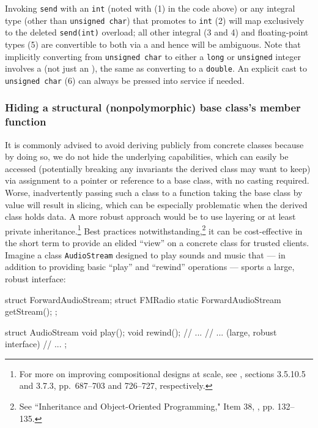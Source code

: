 \noindent Invoking \lstinline!send! with an \lstinline!int! (noted with (1) in the code above) or any integral type
(other than \lstinline!unsigned!~\lstinline!char!) that promotes to \lstinline!int! (2)
will map exclusively to the deleted \lstinline!send(int)! overload; all
other integral (3 and 4) and floating-point types (5) are convertible to
both via a  and hence will be ambiguous. Note that
implicitly converting from \lstinline!unsigned!~\lstinline!char! to either a
\lstinline!long! or \lstinline!unsigned! integer involves a  (not just an ), the same as
  converting to a \lstinline!double!.
An explicit cast to \lstinline!unsigned!~\lstinline!char! (6) can always be
pressed into service if needed.

\subsubsection[Hiding a structural (nonpolymorphic) base class's member function]{Hiding a structural (nonpolymorphic) base class’s member function}\label{hiding-a-structural-(nonpolymorphic)-base-class's-member-function}

It is commonly advised to avoid deriving publicly from concrete classes because by doing so, we do not hide the underlying capabilities, which can easily be accessed (potentially breaking any invariants the derived class may want to keep) via assignment to a pointer or reference to a base class, with no casting required.  Worse, inadvertently passing such a class to a function taking the base class by value will result in slicing, which can be especially problematic when the derived class holds data. A more robust approach would be to use layering or at least private inheritance.\footnote{For more on improving compositional designs at scale, see
  \cite{lakos20}, sections 3.5.10.5 and 3.7.3, pp.~687--703 and
  726--727, respectively.} Best practices notwithstanding,\footnote{See ``Inheritance and Object-Oriented Programming," Item 38, \cite{meyers92}, pp. 132--135.} it can be cost-effective in the short
term to provide an elided ``view'' on a concrete class for trusted
clients. Imagine a class \lstinline!AudioStream! designed to play sounds
and music that --- in addition to providing basic ``play'' and
``rewind'' operations --- sports a large, robust interface:

\begin{emcppshiddenlisting}[emcppsbatch=e2]
struct ForwardAudioStream;
struct FMRadio {
    static ForwardAudioStream getStream();
};
\end{emcppshiddenlisting}
\begin{emcppslisting}[emcppsbatch=e2]
struct AudioStream
{
    void play();
    void rewind();
    // ...
    // ... (large, robust interface)
    // ...
};
\end{emcppslisting}


